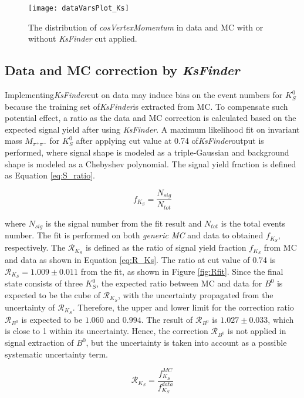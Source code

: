  \begin{figure}[htpb]
	\centering
	\texttt{[image: dataVarsPlot\_Ks]}
	\caption{The distribution of \textit{cosVertexMomentum} in data and MC with or without \textit{KsFinder} cut applied.}
	\label{fig:cosVex_dataMC}
\end{figure}

\subsection{Data and MC correction by \textit{KsFinder}}
Implementing\textit{KsFinder}cut on data may induce bias on the event numbers for $K_S^0$ because the training set of\textit{KsFinder}is extracted from MC. To compensate such potential effect, a ratio as the data and MC correction is calculated based on the expected signal yield after using \textit{KsFinder}. A maximum likelihood fit on invariant mass $M_{\pi^+\pi^-}$ for $K_S^0$ after applying cut value at 0.74 of\textit{KsFinder}output is performed, where signal shape is modeled as a triple-Gaussian and background shape is modeled as a Chebyshev polynomial. The signal yield fraction is defined as Equation \ref{eq:S_ratio}.

\begin{equation}\label{eq:S_ratio}
	f_{K_S} = \frac{N_{sig}}{N_{tot}}
\end{equation}

where $N_{sig}$ is the signal number from the fit result and $N_{tot}$ is the total events number.
The fit is performed on both \textit{generic MC} and data to obtained $f_{K_S} $, respectively.
The $\mathcal{R}_{K_S}$ is defined as the ratio of signal yield fraction  $f_{K_S} $ from MC and data as shown in Equation \ref{eq:R_Ks}. The ratio at cut value of 0.74 is $\mathcal{R}_{K_S} = 1.009\pm 0.011$ from the fit, as shown in Figure \ref{fig:Rfit}. Since the final state consists of three $K_S^0$, the expected ratio between MC and data for $B^0$ is expected to be the cube of $\mathcal{R}_{K_S}$, with the uncertainty propagated from the uncertainty of $\mathcal{R}_{K_S}$.  Therefore, the upper and lower limit for the correction ratio  $\mathcal{R}_{B^0}$ is expected to be $1.060$ and $0.994$. The result of $\mathcal{R}_{B^0}$ is $1.027 \pm 0.033$, which is close to 1 within its uncertainty. Hence, the correction $\mathcal{R}_{B^0}$ is not applied in signal extraction of $B^0$, but the uncertainty is taken into account as a possible systematic uncertainty term. 
 
\begin{equation}\label{eq:R_Ks}
\mathcal{R}_{K_S} = \frac{f_{K_S}^{MC}}{f_{K_S}^{data}}
\end{equation}

